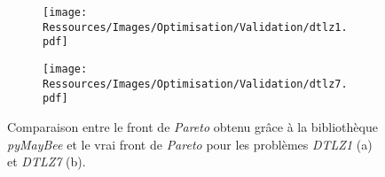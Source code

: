 \begin{figure}
    \centering
    \begin{subfigure}[b]{0.49\textwidth}
        \centering
        \texttt{[image: Ressources/Images/Optimisation/Validation/dtlz1.pdf]}
        \caption{}
        \label{fig:dtlz1}
    \end{subfigure}
    \begin{subfigure}[b]{0.49\textwidth}
        \centering
        \texttt{[image: Ressources/Images/Optimisation/Validation/dtlz7.pdf]}
        \caption{}
        \label{fig:dtlz7}
    \end{subfigure}
    \quad
    \caption[Front de \textit{Pareto} obtenu pour $3$ problèmes distincts]
             {Comparaison entre le front de \textit{Pareto} obtenu grâce à la bibliothèque
              \textit{pyMayBee} et le vrai front de \textit{Pareto} pour les
              problèmes \textit{DTLZ1} (a) et \textit{DTLZ7} (b).}
    \label{fig:convergence_pareto_pymaybee}
\end{figure}


